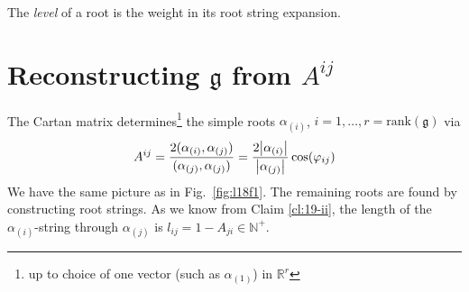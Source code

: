 
\begin{definition}[]
  The \emph{level} of a root is the weight in its root string expansion.
\end{definition}

\section{Reconstructing \texorpdfstring{$\mathfrak{g}$}{the Lie Algebra} from \texorpdfstring{$A^{ij}$}{the Cartan Matrix}}%
\label{sec:reconstructing_the_lie_algebra_from_the_cartan_matrix}

The Cartan matrix determines\footnote{up to choice of one vector (such as $\alpha_{(1)}$) in $\mathbb{R}^r$} the simple roots $\alpha_{(i)}$,  $i = 1, \dots, r = \text{rank}(\mathfrak{g})$ via
\begin{equation}
  A^{ij} = \frac{2(\alpha_{(i)}, \alpha_{(j)})}{(\alpha_{(j)}, \alpha_{(j)})} = \frac{2 \abs{\alpha_{(i)}}}{\abs{\alpha_{(j)}}} \cos(\varphi_{ij})
\end{equation}
We have the same picture as in Fig.~\ref{fig:l18f1}.
The remaining roots are found by constructing root strings. As we know from Claim \ref{cl:19-ii}, the length of the $\alpha_{(i)}$-string through $\alpha_{(j)}$ is $ l_{ij} = 1 - A_{ji} \in \mathbb{N}^+$.

